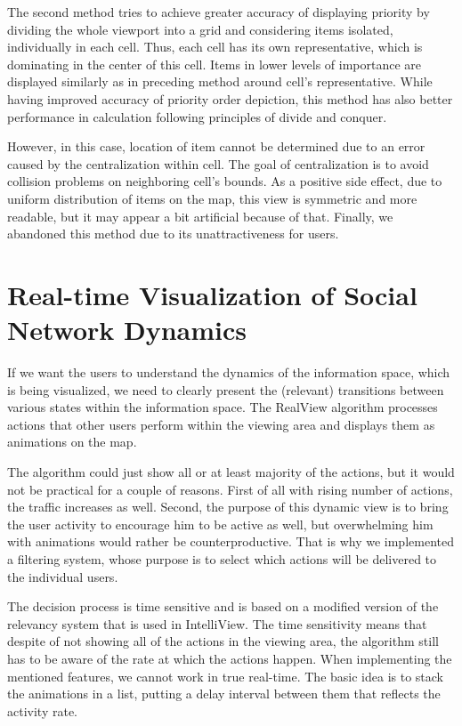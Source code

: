 \documentclass[10pt]{article}
\begin{document}
The second method tries to achieve greater accuracy of displaying priority by dividing the whole viewport into a grid and considering items isolated, individually in each cell. Thus, each cell has its own representative, which is dominating in the center of this cell. Items in lower levels of importance are displayed similarly as in preceding method around cell's representative. While having improved accuracy of priority order depiction, this method has also better performance in calculation following principles of divide and conquer.

However, in this case, location of item cannot be determined due to an error caused by the centralization within cell. The goal of centralization is to avoid collision
problems on neighboring cell's bounds. As a positive side effect, due to uniform distribution of items on the map, this view is symmetric and more readable, but it may appear a bit artificial because of that. Finally, we abandoned this method due to its unattractiveness for users.


\section{Real-time Visualization of Social Network Dynamics}
\label{4}
If we want the users to understand the dynamics of the information space, which is being visualized, we need to clearly present the (relevant) transitions between various states within the information space. The RealView algorithm processes actions that other users perform within the viewing area and displays them as animations on the map.

The algorithm could just show all or at least majority of the actions, but it would not be practical for a couple of reasons. First of all with rising number of actions, the traffic increases as well. Second, the purpose of this dynamic view is to bring the user activity to encourage him to be active as well, but overwhelming him with animations would rather be counterproductive. That is why we implemented a filtering system, whose purpose is to select which actions will be delivered to the individual users.

The decision process is time sensitive and is based on a modified version of the relevancy system that is used in IntelliView. The time sensitivity means that despite of not showing all of the actions in the viewing area, the algorithm still has to be aware of the rate at which the actions happen. When implementing the mentioned features, we cannot work in true real-time. The basic idea is to stack the animations in a list, putting a delay interval between them that reflects the activity rate.
\end{document}
